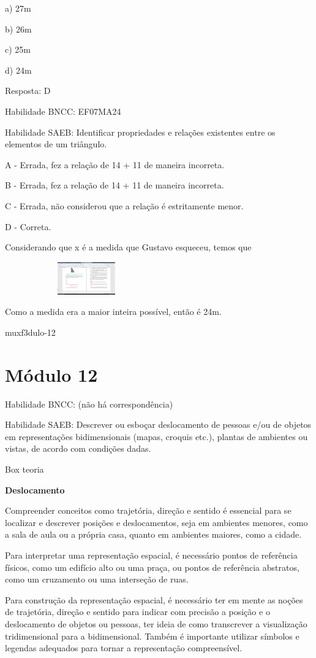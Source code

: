 {a) 27m

b) 26m

c) 25m

d) 24m

Resposta: D

Habilidade BNCC: EF07MA24

Habilidade SAEB: Identificar propriedades e relações existentes entre os
elementos de um triângulo.

A - Errada, fez a relação de 14 + 11 de maneira incorreta.

B - Errada, fez a relação de 14 + 11 de maneira incorreta.

C - Errada, não considerou que a relação é estritamente menor.

D - Correta.

Considerando que x é a medida que Gustavo esqueceu, temos que

\includegraphics[width=2.76927in,height=0.55208in]{./imgSAEB_7_MAT/media/image55.png}

Como a medida era a maior inteira possível, então é 24m.

muxf3dulo-12}{%
\section{Módulo 12}

Habilidade BNCC: (não há correspondência)

Habilidade SAEB: Descrever ou esboçar deslocamento de pessoas e/ou de
objetos em representações bidimensionais (mapas, croquis etc.), plantas
de ambientes ou vistas, de acordo com condições dadas.

Box teoria

\textbf{{Deslocamento}}

Compreender conceitos como trajetória, direção e sentido é essencial
para se localizar e descrever posições e deslocamentos, seja em
ambientes menores, como a sala de aula ou a própria casa, quanto em
ambientes maiores, como a cidade.

Para interpretar uma representação espacial, é necessário pontos de
referência físicos, como um edifício alto ou uma praça, ou pontos de
referência abstratos, como um cruzamento ou uma interseção de ruas.

Para construção da representação espacial, é necessário ter em mente as
noções de trajetória, direção e sentido para indicar com precisão a
posição e o deslocamento de objetos ou pessoas, ter ideia de como
transcrever a visualização tridimensional para a bidimensional. Também é
importante utilizar símbolos e legendas adequados para tornar a
representação compreensível.

}
